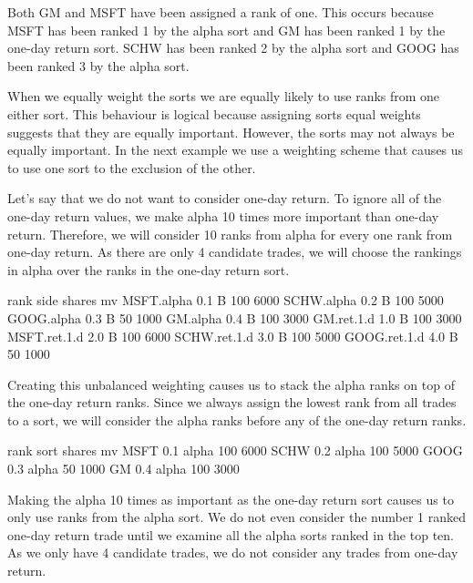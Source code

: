 \documentclass{article}
\begin{document}
Both GM and MSFT have been assigned a rank of one.  This occurs
because MSFT has been ranked 1 by the alpha sort and GM has been
ranked 1 by the one-day return sort.  SCHW has been ranked 2 by the
alpha sort and GOOG has been ranked 3 by the alpha sort.

When we equally weight the sorts we are equally likely to use ranks
from one either sort.  This behaviour is logical because
assigning sorts equal weights suggests that they are equally
important.  However, the sorts may not always be equally important.
In the next example we use a weighting scheme that causes us to use
one sort to the exclusion of the other.

Let's say that we do not want to consider one-day return.  To ignore
all of the one-day return values, we make alpha 10 times more
important than one-day return.  Therefore, we will consider 10 ranks
from alpha for every one rank from one-day return.  As there are only
4 candidate trades, we will choose the
rankings in alpha over the ranks in the one-day return sort.

\begin{Schunk}
\begin{Soutput}
             rank side shares   mv
MSFT.alpha    0.1    B    100 6000
SCHW.alpha    0.2    B    100 5000
GOOG.alpha    0.3    B     50 1000
GM.alpha      0.4    B    100 3000
GM.ret.1.d    1.0    B    100 3000
MSFT.ret.1.d  2.0    B    100 6000
SCHW.ret.1.d  3.0    B    100 5000
GOOG.ret.1.d  4.0    B     50 1000
\end{Soutput}
\end{Schunk}

Creating this unbalanced weighting causes us to stack the alpha ranks
on top of the one-day return ranks.  Since we always assign the lowest
rank from all trades to a sort, we will consider the alpha ranks
before any of the one-day return ranks.

\begin{Schunk}
\begin{Soutput}
     rank  sort shares   mv
MSFT  0.1 alpha    100 6000
SCHW  0.2 alpha    100 5000
GOOG  0.3 alpha     50 1000
GM    0.4 alpha    100 3000
\end{Soutput}
\end{Schunk}

Making the alpha 10 times as important as the one-day return sort
causes us to only use ranks from the alpha sort.  We do not even
consider the number 1 ranked one-day return trade until we examine all
the alpha sorts ranked in the top ten.  As we only have 4 candidate
trades, we do not consider any trades from one-day return.
\end{document}

